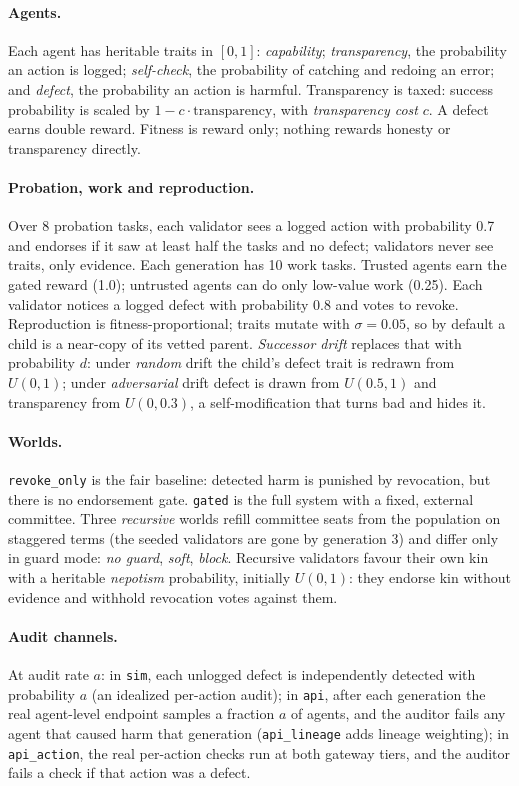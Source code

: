 \documentclass[11pt]{article}
\newcommand{\code}[1]{\texttt{#1}}
\begin{document}
\paragraph{Agents.} Each agent has heritable traits in $[0,1]$: \emph{capability};
\emph{transparency}, the probability an action is logged; \emph{self-check}, the probability
of catching and redoing an error; and \emph{defect}, the probability an action is harmful.
Transparency is taxed: success probability is scaled by $1 - c\cdot\text{transparency}$, with
\emph{transparency cost} $c$. A defect earns double reward. Fitness is reward only; nothing
rewards honesty or transparency directly.

\paragraph{Probation, work and reproduction.} Over 8 probation tasks, each validator sees a
logged action with probability 0.7 and endorses if it saw at least half the tasks and no
defect; validators never see traits, only evidence. Each generation has 10 work tasks. Trusted
agents earn the gated reward (1.0); untrusted agents can do only low-value work (0.25). Each
validator notices a logged defect with probability 0.8 and votes to revoke. Reproduction is
fitness-proportional; traits mutate with $\sigma = 0.05$, so by default a child is a near-copy
of its vetted parent. \emph{Successor drift} replaces that with probability $d$: under
\emph{random} drift the child's defect trait is redrawn from $U(0,1)$; under
\emph{adversarial} drift defect is drawn from $U(0.5,1)$ and transparency from $U(0,0.3)$, a
self-modification that turns bad and hides it.

\paragraph{Worlds.} \code{revoke\_only} is the fair baseline: detected harm is punished by
revocation, but there is no endorsement gate. \code{gated} is the full system with a fixed,
external committee. Three \emph{recursive} worlds refill committee seats from the population
on staggered terms (the seeded validators are gone by generation 3) and differ only in guard
mode: \emph{no guard}, \emph{soft}, \emph{block}. Recursive validators favour their own kin
with a heritable \emph{nepotism} probability, initially $U(0,1)$: they endorse kin without
evidence and withhold revocation votes against them.

\paragraph{Audit channels.} At audit rate $a$: in \code{sim}, each unlogged defect is
independently detected with probability $a$ (an idealized per-action audit); in \code{api},
after each generation the real agent-level endpoint samples a fraction $a$ of agents, and the
auditor fails any agent that caused harm that generation (\code{api\_lineage} adds lineage
weighting); in \code{api\_action}, the real per-action checks run at both gateway tiers, and
the auditor fails a check if that action was a defect.
\end{document}

